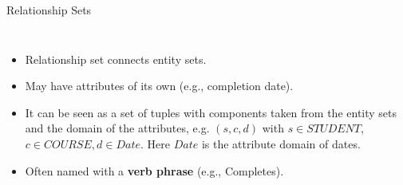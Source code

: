 \documentclass[10pt,aspectratio=169]{beamer}
\begin{document}
\begin{frame}{Relationship Sets}
\begin{columns}[T,onlytextwidth]
\begin{itemize}
  \item Relationship set connects entity sets. 
  \item May have attributes of its own (e.g., completion date).
  \item It can be seen as a set of tuples with components taken from the entity sets and the domain of the attributes, e.g. $(s, c, d)$ with $s \in STUDENT$, $c \in COURSE, d \in Date$. Here $Date$ is the attribute domain of dates.
  \item Often named with a \textbf{verb phrase} (e.g., Completes).
\end{itemize}

\centering
{}
\end{columns}
\end{frame}
\end{document}
